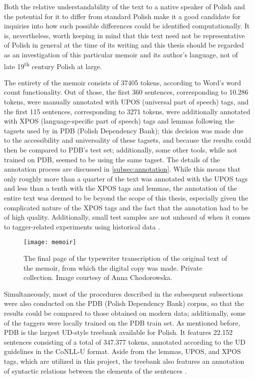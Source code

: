 Both the relative understandability of the text to a native speaker of Polish and the potential for it to differ from standard Polish make it a good candidate for inquiries into how such possible differences could be identified computationally. It is, nevertheless, worth keeping in mind that this text need not be representative of Polish in general at the time of its writing and this thesis should be regarded as an investigation of this particular memoir and its author's language, not of late 19\textsuperscript{th} century Polish at large.

The entirety of the memoir consists of 37405 tokens, according to Word's word count functionality. Out of those, the first 360 sentences, corresponding to 10.286 tokens, were manually annotated with UPOS (universal part of speech) tags, and the first 115 sentences, corresponding to 3271 tokens, were additionally annotated with XPOS (language-specific part of speech) tags and lemmas following the tagsets used by \citet{wroblewska-2018-extended} in PDB (Polish Dependency Bank); this decision was made due to the accessibility and universality of these tagsets, and because the results could then be compared to PDB's test set; additionally, some other tools, while not trained on PDB, seemed to be using the same tagset. The details of the annotation process are discussed in \autoref{subsec:annotation}. While this means that only roughly more than a quarter of the text was annotated with the UPOS tags and less than a tenth with the XPOS tags and lemmas, the annotation of the entire text was deemed to be beyond the scope of this thesis, especially given the complicated nature of the XPOS tags and the fact that the annotation had to be of high quality. Additionally, small test samples are not unheard of when it comes to tagger-related experiments using historical data \citep{bollmann-2013-pos, hupkes16, rayson07}. 

\begin{figure}[h]
\centering
\texttt{[image: memoir]}
\caption{\label{fig:memoir} The final page of the typewriter transcription of the original text of the memoir, from which the digital copy was made. Private collection. Image courtesy of Anna Chodorowska.}
\end{figure}

Simultaneously, most of the procedures described in the subsequent subsections were also conducted on the PDB (Polish Dependency Bank) corpus, so that the results could be compared to those obtained on modern data; additionally, some of the taggers were locally trained on the PDB train set. As mentioned before, PDB is the largest UD-style treebank available for Polish. It features 22.152 sentences consisting of a total of 347.377 tokens, annotated according to the UD guidelines in the CoNLL-U format. Aside from the lemmas, UPOS, and XPOS tags, which are utilized in this project, the treebank also features an annotation of syntactic relations between the elements of the sentences \citep{wroblewska-2018-extended, universaldependencies}.

